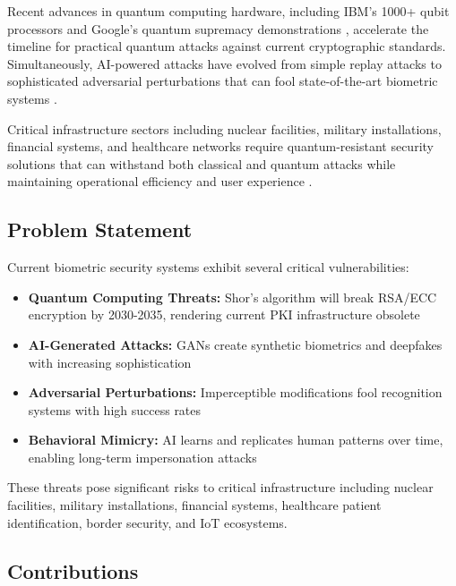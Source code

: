 \documentclass[12pt,a4paper]{article}
\begin{document}
Recent advances in quantum computing hardware, including IBM's 1000+ qubit processors and Google's quantum supremacy demonstrations \cite{arute2019quantum}, accelerate the timeline for practical quantum attacks against current cryptographic standards. Simultaneously, AI-powered attacks have evolved from simple replay attacks to sophisticated adversarial perturbations that can fool state-of-the-art biometric systems \cite{szegedy2013intriguing, carlini2017towards}.

Critical infrastructure sectors including nuclear facilities, military installations, financial systems, and healthcare networks require quantum-resistant security solutions that can withstand both classical and quantum attacks while maintaining operational efficiency and user experience \cite{nist2022post}.

\subsection{Problem Statement}

Current biometric security systems exhibit several critical vulnerabilities:

\begin{itemize}
    \item \textbf{Quantum Computing Threats:} Shor's algorithm will break RSA/ECC encryption by 2030-2035, rendering current PKI infrastructure obsolete \cite{mosca2018cybersecurity}
    \item \textbf{AI-Generated Attacks:} GANs create synthetic biometrics and deepfakes with increasing sophistication \cite{rossler2019faceforensics}
    \item \textbf{Adversarial Perturbations:} Imperceptible modifications fool recognition systems with high success rates \cite{sharif2016accessorize}
    \item \textbf{Behavioral Mimicry:} AI learns and replicates human patterns over time, enabling long-term impersonation attacks \cite{frank2013touchalytics}
\end{itemize}

These threats pose significant risks to critical infrastructure including nuclear facilities, military installations, financial systems, healthcare patient identification, border security, and IoT ecosystems.

\subsection{Contributions}
\end{document}

